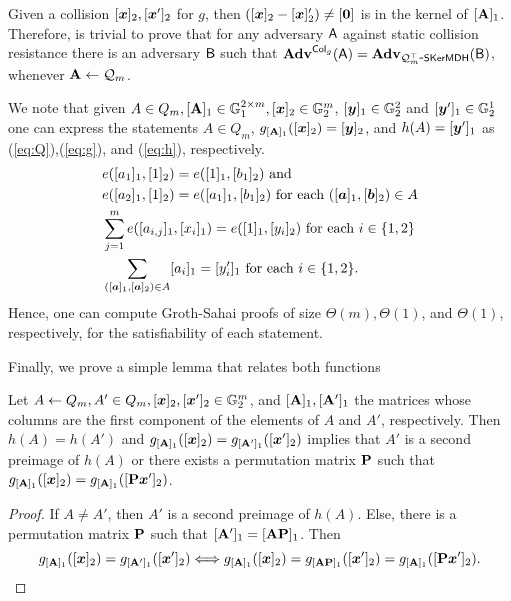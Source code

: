 Given a collision $[{\boldsymbol{x}}]_2,[{\boldsymbol{x}}']_2$ for $g$, then $([{\boldsymbol{x}}]_2-[{\boldsymbol{x}}]'_2)\neq [{\boldsymbol{0}}]$ is in the kernel of $[\mathbf{{A}}]_1$. Therefore, is trivial to prove that for any adversary $\mathsf{A}$ against static collision resistance there is an adversary $\mathsf{B}$ such that $\mathbf{Adv}^{\mathsf{Col}_g}(\mathsf{A})=\mathbf{Adv}_{\mathcal{Q}_m^\top\mbox{-}\mathsf{SKerMDH}}(\mathsf{B})$, whenever $\mathbf{{A}}\gets\mathcal{Q}_m$.

We note that given $A\in Q_m,[\mathbf{{A}}]_1\in\mathbb{G}^{2\times m}_1,[{\boldsymbol{x}}]_2\in\mathbb{G}^m_2$, $[{\boldsymbol{y}}]_1\in\mathbb{G}_2^2$ and $[{\boldsymbol{y}}']_1\in\mathbb{G}^1_2$ one can express the statements $A\in Q_m$, $g_{[\mathbf{{A}}]_1}([{\boldsymbol{x}}]_2)=[{\boldsymbol{y}}]_2$, and $h(A)=[{\boldsymbol{y}}']_1$ as (\ref{eq:Q}),(\ref{eq:g}), and (\ref{eq:h}), respectively.
 \begin{align}
&e([a_{1}]_1,[1]_2) = e([1]_1,[{b}_1]_2)\text{ and }\nonumber\\
&e([a_{2}]_1,[1]_2)=e([a_{1}]_1,[b_1]_2)
\text{ for each }([{\boldsymbol{a}}]_1,[{\boldsymbol{b}}]_2)\in A \label{eq:Q}\\
&\sum_{j=1}^m e([a_{i,j}]_1,[x_i]_1) = e([1]_1,[y_i]_2) \text{ for each } i\in\{1,2\} \label{eq:g}\\
&\sum_{([{\boldsymbol{a}}]_1,[{\boldsymbol{a}}]_2)\in A} [a_i]_1 = [y'_i]_1 \text{ for each } i\in\{1,2\}.\label{eq:h}
\end{align}
Hence, one can compute Groth-Sahai proofs of size $\Theta(m),\Theta(1)$, and $\Theta(1)$, respectively, for the satisfiability of each statement.

Finally, we prove a simple lemma that relates both functions
\begin{lemma}\label{lemma:hg}
Let $A\gets Q_m,A'\in Q_m,[{\boldsymbol{x}}]_2,[{\boldsymbol{x}}']_2\in\mathbb{G}^m_2$, and $[\mathbf{{A}}]_1,[\mathbf{{A}}']_1$ the matrices whose columns are the first component of the elements of $A$ and $A'$, respectively. Then $h(A)=h(A')$ and $g_{[\mathbf{{A}}]_1}([{\boldsymbol{x}}]_2)=g_{[\mathbf{{A}}']_1}([{\boldsymbol{x}}']_2)$ implies that $A'$ is a second preimage of $h(A)$ or there exists a permutation matrix $\mathbf{{P}}$ such that $g_{[\mathbf{{A}}]_1}([{\boldsymbol{x}}]_2)=g_{[\mathbf{{A}}]_1}([\mathbf{{P}}{\boldsymbol{x}}']_2)$.
\end{lemma}
\begin{proof}
If $A\neq A'$, then $A'$ is a second preimage of $h(A)$. Else, there is a permutation matrix $\mathbf{{P}}$ such that $[\mathbf{{A}}']_1 =[\mathbf{{A}}\mathbf{{P}}]_1$. Then
$$
 g_{[\mathbf{{A}}]_1}([{\boldsymbol{x}}]_2)=g_{[\mathbf{{A}}']_1}([{\boldsymbol{x}}']_2)\Longleftrightarrow  g_{[\mathbf{{A}}]_1}([{\boldsymbol{x}}]_2)=g_{[\mathbf{{A}}\mathbf{{P}}]_1}([{\boldsymbol{x}}']_2)=g_{[\mathbf{{A}}]_1}([\mathbf{{P}}{\boldsymbol{x}}']_2).
$$
\end{proof}